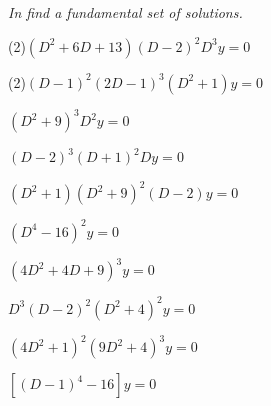 %
\textsl{In  find a
fundamental set of solutions.}
\begin{exerciselistTwoColumn}
\item(2)\label{exer:9.2.29}$(D^2+6D+13)(D-2)^2D^3y=0$
\item(2)\label{exer:9.2.30}$(D-1)^2(2D-1)^3(D^2+1)y=0$
\item\label{exer:9.2.31}$(D^2+9)^3D^2y=0$%
\item\label{exer:9.2.32}$(D-2)^3(D+1)^2Dy=0$
\item\label{exer:9.2.33}$(D^2+1)(D^2+9)^2(D-2)y=0$%
\item\label{exer:9.2.34}$(D^4-16)^2y=0$
\item\label{exer:9.2.35}$(4D^2+4D+9)^3y=0$%
\item\label{exer:9.2.36}$D^3(D-2)^2(D^2+4)^2y=0$
\item\label{exer:9.2.37}$(4D^2+1)^2(9D^2+4)^3y=0$%
\item\label{exer:9.2.38}$\left[(D-1)^4-16\right]y=0$
\end{exerciselistTwoColumn}
